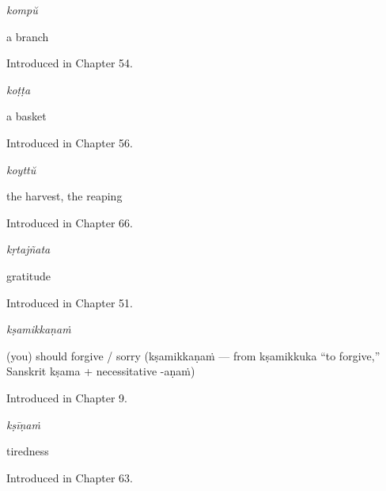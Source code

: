 \noindent\begin{minipage}[t]{\linewidth}
\raggedright
\textbf{}\enspace\emph{kompŭ}\par
\small a branch\par
\footnotesize Introduced in Chapter 54.
\end{minipage}\par\medskip

\noindent\begin{minipage}[t]{\linewidth}
\raggedright
\textbf{}\enspace\emph{koṭṭa}\par
\small a basket\par
\footnotesize Introduced in Chapter 56.
\end{minipage}\par\medskip

\noindent\begin{minipage}[t]{\linewidth}
\raggedright
\textbf{}\enspace\emph{koyttŭ}\par
\small the harvest, the reaping\par
\footnotesize Introduced in Chapter 66.
\end{minipage}\par\medskip

\noindent\begin{minipage}[t]{\linewidth}
\raggedright
\textbf{}\enspace\emph{kṛtajñata}\par
\small gratitude\par
\footnotesize Introduced in Chapter 51.
\end{minipage}\par\medskip

\noindent\begin{minipage}[t]{\linewidth}
\raggedright
\textbf{}\enspace\emph{kṣamikkaṇaṁ}\par
\small (you) should forgive / sorry (kṣamikkaṇaṁ — from kṣamikkuka \textquotedblleft{}to forgive,\textquotedblright{} Sanskrit kṣama + necessitative -aṇaṁ)\par
\footnotesize Introduced in Chapter 9.
\end{minipage}\par\medskip

\noindent\begin{minipage}[t]{\linewidth}
\raggedright
\textbf{}\enspace\emph{kṣīṇaṁ}\par
\small tiredness\par
\footnotesize Introduced in Chapter 63.
\end{minipage}\par\medskip

